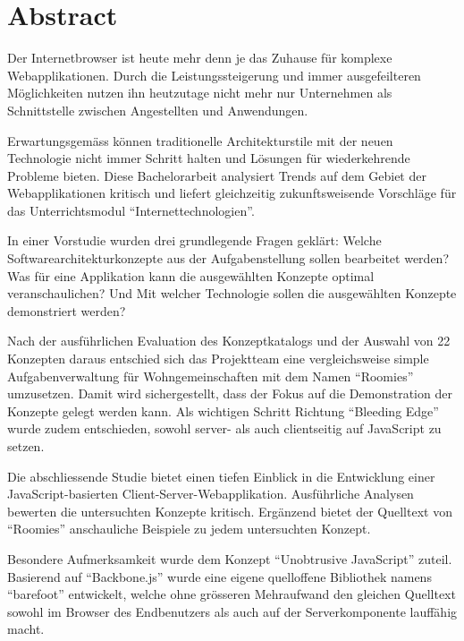 \clearpage
\thispagestyle{empty}

\section*{Abstract}

Der Internetbrowser ist heute mehr denn je das Zuhause für komplexe Webapplikationen. Durch die Leistungssteigerung und immer ausgefeilteren Möglichkeiten nutzen ihn heutzutage nicht mehr nur Unternehmen als Schnittstelle zwischen Angestellten und Anwendungen.

Erwartungsgemäss können traditionelle Architekturstile mit der neuen Technologie nicht immer Schritt halten und Lösungen für wiederkehrende Probleme bieten. Diese Bachelorarbeit analysiert Trends auf dem Gebiet der Webapplikationen kritisch und liefert gleichzeitig zukunftsweisende Vorschläge für das Unterrichtsmodul ``Internettechnologien''.

In einer Vorstudie wurden drei grundlegende Fragen geklärt: Welche Softwarearchitekturkonzepte aus der Aufgabenstellung sollen bearbeitet werden? Was für eine Applikation kann die ausgewählten Konzepte optimal veranschaulichen? Und Mit welcher Technologie sollen die ausgewählten Konzepte demonstriert werden?

Nach der ausführlichen Evaluation des Konzeptkatalogs und der Auswahl von 22 Konzepten daraus entschied sich das Projektteam eine vergleichsweise simple Aufgabenverwaltung für Wohngemeinschaften mit dem Namen ``Roomies'' umzusetzen. Damit wird sichergestellt, dass der Fokus auf die Demonstration der Konzepte gelegt werden kann. Als wichtigen Schritt Richtung ``Bleeding Edge'' wurde zudem entschieden, sowohl server- als auch clientseitig auf JavaScript zu setzen.

Die abschliessende Studie bietet einen tiefen Einblick in die Entwicklung einer JavaScript-basierten Client-Server-Webapplikation. Ausführliche Analysen bewerten die untersuchten Konzepte kritisch. Ergänzend bietet der Quelltext von ``Roomies'' anschauliche Beispiele zu jedem untersuchten Konzept.

Besondere Aufmerksamkeit wurde dem Konzept ``Unobtrusive JavaScript'' zuteil. Basierend auf ``Backbone.js'' wurde eine eigene quelloffene Bibliothek namens ``barefoot'' entwickelt, welche ohne grösseren Mehraufwand den gleichen Quelltext sowohl im Browser des Endbenutzers als auch auf der Serverkomponente lauffähig macht.
\clearpage